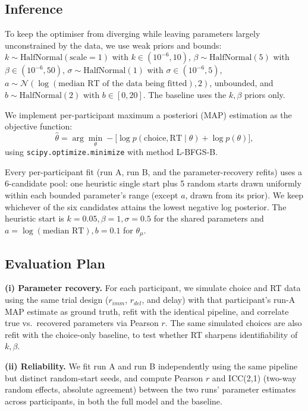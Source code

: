 \documentclass[11pt,a4paper]{article}
\begin{document}
	\subsection{Inference}
	
	To keep the optimiser from diverging while leaving parameters largely unconstrained by the data, we use weak priors and bounds: $k\sim\text{HalfNormal}(\text{scale}=1)$ with $k\in(10^{-6},10)$, $\beta\sim\text{HalfNormal}(5)$ with $\beta\in(10^{-6},50)$, $\sigma\sim\text{HalfNormal}(1)$ with $\sigma\in(10^{-6},5)$, $a\sim\mathcal N(\log(\text{median RT of the data being fitted}),2)$, unbounded, and $b\sim\text{HalfNormal}(2)$ with $b\in[0,20]$. The baseline uses the $k,\beta$ priors only.
	
	We implement per-participant maximum a posteriori (MAP) estimation as the objective function:
	\begin{equation*}
		\hat\theta = \arg\min_\theta -\big[\log p(\text{choice},\text{RT}\mid\theta) + \log p(\theta)\big],
	\end{equation*}
	using \texttt{scipy.optimize.minimize} with method L-BFGS-B.
	
	Every per-participant fit (run A, run B, and the parameter-recovery refits) uses a 6-candidate pool: one heuristic single start plus 5 random starts drawn uniformly within each bounded parameter's range (except $a$, drawn from its prior). We keep whichever of the six candidates attains the lowest negative log posterior. The heuristic start is $k=0.05,\beta=1,\sigma=0.5$ for the shared parameters and $a=\log(\text{median RT}), b=0.1$ for $\theta_\mu$.
	
	\subsection{Evaluation Plan}
	
	\textbf{(i) Parameter recovery.} For each participant, we simulate choice and RT data using the same trial design ($r_{imm}$, $r_{del}$, and delay) with that participant's run-A MAP estimate as ground truth, refit with the identical pipeline, and correlate true vs.\ recovered parameters via Pearson $r$. The same simulated choices are also refit with the choice-only baseline, to test whether RT sharpens identifiability of $k,\beta$.
	
	\textbf{(ii) Reliability.} We fit run A and run B independently using the same pipeline but distinct random-start seeds, and compute Pearson $r$ and ICC(2,1) (two-way random effects, absolute agreement)\cite{shrout1979intraclass} between the two runs' parameter estimates across participants, in both the full model and the baseline.
	
\end{document}
